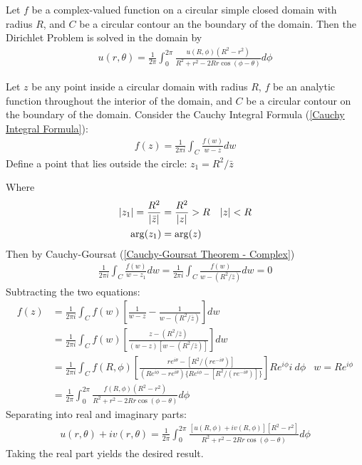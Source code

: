 \documentclass[12pt, english]{book}
\makeatletter
\renewenvironment{proof}[1][\proofname]{\par
	\pushQED{\qed}%
	\normalfont \topsep6\p@\@plus6\p@\relax
	\list{}{%
		\settowidth{\leftmargin}{\itshape\proofname:\hskip\labelsep}%
		\setlength{\labelwidth}{0pt}%
		\setlength{\itemindent}{-\leftmargin}%
		}%
	\item[\hskip\labelsep\itshape#1\@addpunct{:}]\ignorespaces
	}{\popQED\endlist\@endpefalse}
\makeatother
\begin{document}
	\begin{definition}
		\label{Poisson Integral Formula (Circle Interior) Definition - Complex}
		Let \(f\) be a complex-valued function on a circular simple closed domain with radius \(R\), and \(C\) be a circular contour an the boundary of the domain. Then the Dirichlet Problem is solved in the domain by
		\begin{align*}
			u(r, \theta)
			= \frac{1}{2\pi} \int_{0}^{2\pi} 
			  \frac{u(R, \phi)(R^2 - r^2)}{R^2 + r^2 - 2Rr \cos(\phi - \theta)} d\phi
		\end{align*}
	\end{definition}
	\begin{proof}
		Let \(z\) be any point inside a circular domain with radius \(R\), \(f\) be an analytic function throughout the interior of the domain, and \(C\) be a circular contour on the boundary of the domain. Consider the Cauchy Integral Formula (\cref{Cauchy Integral Formula}):
		\begin{align*}
			f(z) = \frac{1}{2\pi i} \int_{C} \frac{f(w)}{w-z} dw
		\end{align*}
		Define a point that lies outside the circle: \(z_1 = R^2/\bar{z}\)
		
		Where
		\begin{align*}
			\abs{z_1} = \frac{R^2}{\abs{\bar{z}}} &= \frac{R^2}{\abs{z}} > R & \abs{z} < R \\
			\arg(z_1) &= \arg(z)
		\end{align*}
		Then by Cauchy-Goursat (\cref{Cauchy-Goursat Theorem - Complex})
		\begin{align*}
			\frac{1}{2\pi i} \int_{C} \frac{f(w)}{w - z_1} dw 
			= \frac{1}{2\pi i} \int_{C} \frac{f(w)}{w - (R^2/\bar{z})} dw 
			= 0
		\end{align*}
		Subtracting the two equations:
		\begin{align*}
			f(z) 
			&= \frac{1}{2\pi i} \int_{C} f(w) \left[ \frac{1}{w - z} - \frac{1}{w - (R^2/\bar{z})}\right] dw \\
			&= \frac{1}{2\pi i} \int_{C} f(w) \left[\frac{z - (R^2/\bar{z})}{(w - z)[w - (R^2/\bar{z})]}\right] dw \\
			&= \frac{1}{2\pi i} \int_{C} f(R, \phi) \left[\frac{re^{i\theta}- [R^2/(re^{-i\theta})]}{(Re^{i\phi} - re^{i\theta})\{Re^{i\phi} - [R^2/(re^{-i\theta})]\}}\right] Re^{i\phi} i \ d\phi 
				& w = Re^{i\phi} \\
			&= \frac{1}{2\pi} \int_{0}^{2\pi} 
			   \frac{f(R,\phi)(R^2 - r^2)}{R^2 + r^2 - 2Rr \cos(\phi - \theta)} d\phi
		\end{align*}
		Separating into real and imaginary parts:
		\begin{align*}
			u(r,\theta) + iv(r,\theta)
			= \frac{1}{2\pi} \int_{0}^{2\pi}
			  \frac{[u(R,\phi) + iv(R,\phi)][R^2 - r^2]}{R^2 + r^2 - 2Rr\cos(\phi - \theta)}  d \phi
		\end{align*}
		Taking the real part yields the desired result.
	\end{proof}
\end{document}
